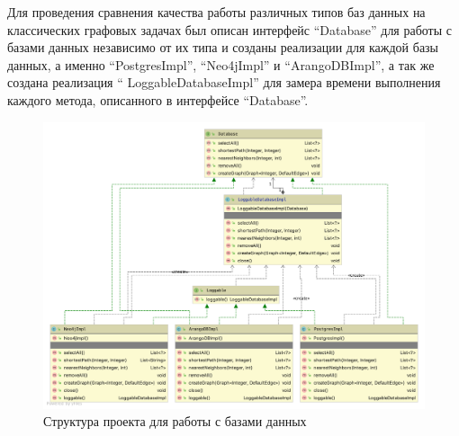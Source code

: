 Для проведения сравнения качества работы различных типов баз данных на классических графовых задачах был описан интерфейс “Database” для
работы с базами данных независимо от их типа и созданы реализации для каждой базы данных, а именно “PostgresImpl”, “Neo4jImpl” и
“ArangoDBImpl”, а так же создана реализация “ LoggableDatabaseImpl” для замера времени выполнения каждого метода, описанного в интерфейсе “Database”.

\begin{figure}[ht!]
    \center
    \includegraphics [scale=0.27] {my_folder/myimg//7}
    \caption{Структура проекта для работы с базами данных}
\end{figure}

%
